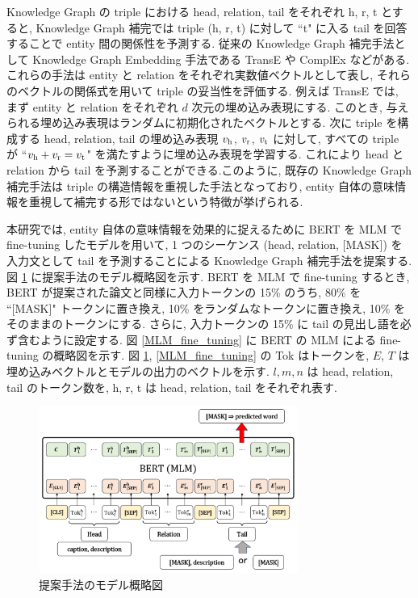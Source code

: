 \documentclass[twocolumn]{jarticle}
\begin{document}
Knowledge Graph の triple における head, relation, tail をそれぞれ h, r, t とすると, Knowledge Graph 補完では triple (h, r, t) に対して ``t" に入る tail を回答することで entity 間の関係性を予測する. 従来の Knowledge Graph 補完手法として Knowledge Graph Embedding 手法である TransE \cite{TransE_WN18} や ComplEx \cite{ComplEx} などがある. これらの手法は entity と relation をそれぞれ実数値ベクトルとして表し, それらのベクトルの関係式を用いて triple の妥当性を評価する. 例えば TransE では, まず entity と relation をそれぞれ $d$ 次元の埋め込み表現にする. このとき, 与えられる埋め込み表現はランダムに初期化されたベクトルとする. 次に triple を構成する head, relation, tail の埋め込み表現 $v_{\rm h}$, $v_{\rm r}$, $v_{\rm t}$ に対して, すべての triple が ``$v_{\rm h} + v_{\rm r} = v_{\rm t}$" を満たすように埋め込み表現を学習する. これにより head と relation から tail を予測することができる.このように, 既存の Knowledge Graph 補完手法は triple の構造情報を重視した手法となっており, entity 自体の意味情報を重視して補完する形ではないという特徴が挙げられる. \par
本研究では, entity 自体の意味情報を効果的に捉えるために BERT を MLM で fine-tuning したモデルを用いて, 1 つのシーケンス (head, relation, [MASK]) を入力文として tail を予測することによる Knowledge Graph 補完手法を提案する. 図 \ref{KG-MLM} に提案手法のモデル概略図を示す. BERT を MLM で fine-tuning するとき, BERT が提案された論文と同様に入力トークンの 15\% のうち, 80\% を ``[MASK]" トークンに置き換え, 10\% をランダムなトークンに置き換え, 10\% をそのままのトークンにする. さらに, 入力トークンの 15\% に tail の見出し語を必ず含むように設定する. 図 \ref{MLM_fine_tuning} に BERT の MLM による fine-tuning の概略図を示す. 図 \ref{KG-MLM}, \ref{MLM_fine_tuning} の Tok はトークンを, $E$, $T$ は埋め込みベクトルとモデルの出力のベクトルを示す. $l, m, n$ は head, relation, tail のトークン数を, h, r, t は head, relation, tail をそれぞれ表す.  \par

\begin{figure}[t]
    \centering
    \includegraphics[width=85mm]{assets/KG-MLM.png}
    \vspace{-5mm}
    \caption{提案手法のモデル概略図}
    \label{KG-MLM}
\end{figure}
\end{document}
